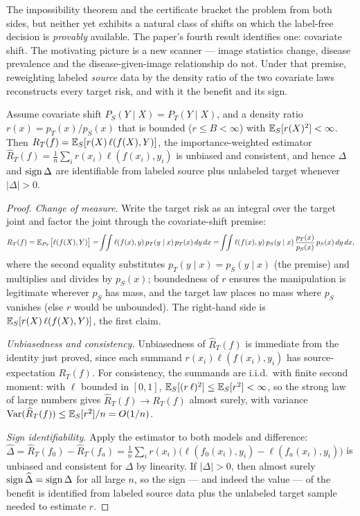 The impossibility theorem and the certificate bracket the problem from both sides, but
neither yet exhibits a natural class of shifts on which the label-free decision is
\emph{provably} available. The paper's fourth result identifies one: covariate shift.
The motivating picture is a new scanner --- image statistics change, disease prevalence
and the disease-given-image relationship do not. Under that premise, reweighting
labeled \emph{source} data by the density ratio of the two covariate laws reconstructs
every target risk, and with it the benefit and its sign.

\begin{theorem}
\label{thm:pos}
Assume covariate shift $P_S(Y\mid X)=P_T(Y\mid X)$, and a density ratio
$r(x)=p_T(x)/p_S(x)$ that is bounded ($r\le B<\infty$) with $\mathbb{E}_S[r(X)^2]<\infty$.
Then $R_T(f)=\mathbb{E}_S[r(X)\,\ell(f(X),Y)]$, the importance-weighted estimator
$\widehat R_T(f)=\tfrac1n\sum_i r(x_i)\ell(f(x_i),y_i)$ is unbiased and consistent, and
hence $\Delta$ and $\operatorname{sign}\Delta$ are identifiable from labeled source plus unlabeled
target whenever $|\Delta|>0$.
\end{theorem}

\begin{proof}
\emph{Change of measure.} Write the target risk as an integral over the target joint
and factor the joint through the covariate-shift premise:
\[
R_T(f)=\mathbb{E}_{P_T}\bigl[\ell(f(X),Y)\bigr]
=\!\int\!\!\int \ell(f(x),y)\,p_T(y\mid x)\,p_T(x)\,dy\,dx
=\!\int\!\!\int \ell(f(x),y)\,p_S(y\mid x)\,\frac{p_T(x)}{p_S(x)}\,p_S(x)\,dy\,dx ,
\]
where the second equality substitutes $p_T(y\mid x)=p_S(y\mid x)$ (the premise) and
multiplies and divides by $p_S(x)$; boundedness of $r$ ensures the manipulation is
legitimate wherever $p_S$ has mass, and the target law places no mass where $p_S$
vanishes (else $r$ would be unbounded). The right-hand side is
$\mathbb{E}_S[r(X)\,\ell(f(X),Y)]$, the first claim.

\emph{Unbiasedness and consistency.} Unbiasedness of $\widehat R_T(f)$ is immediate
from the identity just proved, since each summand $r(x_i)\ell(f(x_i),y_i)$ has
source-expectation $R_T(f)$. For consistency, the summands are i.i.d.\ with finite
second moment: with $\ell$ bounded in $[0,1]$,
$\mathbb{E}_S[(r\,\ell)^2]\le\mathbb{E}_S[r^2]<\infty$, so the strong law of large numbers gives
$\widehat R_T(f)\to R_T(f)$ almost surely, with variance
$\mathrm{Var}(\widehat R_T(f))\le\mathbb{E}_S[r^2]/n=O(1/n)$.

\emph{Sign identifiability.} Apply the estimator to both models and difference:
$\widehat\Delta=\widehat R_T(f_0)-\widehat R_T(f_a)
=\tfrac1n\sum_ir(x_i)\bigl(\ell(f_0(x_i),y_i)-\ell(f_a(x_i),y_i)\bigr)$ is unbiased
and consistent for $\Delta$ by linearity. If $|\Delta|>0$, then almost surely
$\operatorname{sign}\widehat\Delta=\operatorname{sign}\Delta$ for all large $n$, so the sign --- and indeed the
value --- of the benefit is identified from labeled source data plus the unlabeled
target sample needed to estimate $r$. \qedhere
\end{proof}

